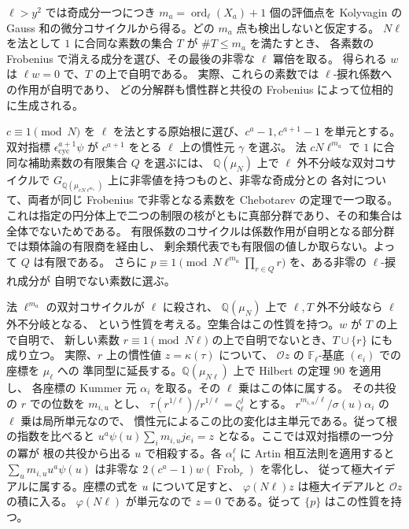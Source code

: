 \(\ell>y^2\) では奇成分一つにつき \(m_a=\operatorname{ord}_\ell(X_a)+1\) 個の評価点を
Kolyvagin の Gauss 和の微分コサイクルから得る。どの \(m_a\) 点も検出しないと仮定する。
\(N\ell\) を法として \(1\) に合同な素数の集合 \(T\) が \(\#T\le m_a\) を満たすとき、
各素数の Frobenius で消える成分を選び、その最後の非零な \(\ell\) 冪倍を取る。
得られる \(w\) は \(\ell w=0\) で、\(T\) の上で自明である。
実際、これらの素数では \(\ell\)-捩れ係数への作用が自明であり、
どの分解群も慣性群と共役の Frobenius によって位相的に生成される。

\(c\equiv1\pmod N\) を \(\ell\) を法とする原始根に選び、\(c^a-1,c^{a+1}-1\) を単元とする。
双対指標 \(\epsilon_{\mathrm{cyc}}^{a+1}\psi\) が \(c^{a+1}\) をとる \(\ell\) 上の慣性元 \(\gamma\) を選ぶ。
法 \(cN\ell^{m_a}\) で \(1\) に合同な補助素数の有限集合 \(Q\) を選ぶには、
\(\mathbb Q(\mu_N)\) 上で \(\ell\) 外不分岐な双対コサイクルで
\(G_{\mathbb Q(\mu_{cN\ell^{m_a}})}\) 上に非零値を持つものと、非零な奇成分との
各対について、両者が同じ Frobenius で非零となる素数を Chebotarev の定理で一つ取る。
これは指定の円分体上で二つの制限の核がともに真部分群であり、その和集合は全体でないためである。
有限係数のコサイクルは係数作用が自明となる部分群では類体論の有限商を経由し、
剰余類代表でも有限個の値しか取らない。よって \(Q\) は有限である。
さらに \(p\equiv1\pmod {N\ell^{m_a}\prod_{r\in Q}r}\) を、ある非零の \(\ell\)-捩れ成分が
自明でない素数に選ぶ。

法 \(\ell^{m_a}\) の双対コサイクルが \(\ell\) に殺され、
\(\mathbb Q(\mu_N)\) 上で \(\ell,T\) 外不分岐なら \(\ell\) 外不分岐となる、
という性質を考える。空集合はこの性質を持つ。\(w\) が \(T\) の上で自明で、
新しい素数 \(r\equiv1\pmod{N\ell}\) の上で自明でないとき、\(T\cup\{r\}\) にも成り立つ。
実際、\(r\) 上の慣性値 \(z=\kappa(\tau)\) について、
\(\mathcal Oz\) の \(\mathbb F_\ell\)-基底 \((e_i)\) での座標を \(\mu_\ell\) への
準同型に延長する。\(\mathbb Q(\mu_{N\ell})\) 上で Hilbert の定理 90 を適用し、
各座標の Kummer 元 \(\alpha_i\) を取る。その \(\ell\) 乗はこの体に属する。
その共役の \(r\) での位数を \(m_{i,u}\) とし、
\(\tau(r^{1/\ell})/r^{1/\ell}=\zeta_\ell^j\) とする。
\(r^{m_{i,u}/\ell}/\sigma(u)\alpha_i\) の \(\ell\) 乗は局所単元なので、
慣性元によるこの比の変化は主単元である。従って根の指数を比べると
\(u^a\psi(u)\sum_i m_{i,u}j e_i=z\) となる。ここでは双対指標の一つ分の冪が
根の共役から出る \(u\) で相殺する。各 \(\alpha_i^\ell\) に Artin 相互法則を適用すると
\(\sum_u m_{i,u}u^a\psi(u)\) は非零な \(2(c^a-1)w(\operatorname{Frob}_r)\) を零化し、
従って極大イデアルに属する。座標の式を \(u\) について足すと、
\(\varphi(N\ell)z\) は極大イデアルと \(\mathcal Oz\) の積に入る。
\(\varphi(N\ell)\) が単元なので \(z=0\) である。従って \(\{p\}\) はこの性質を持つ。

